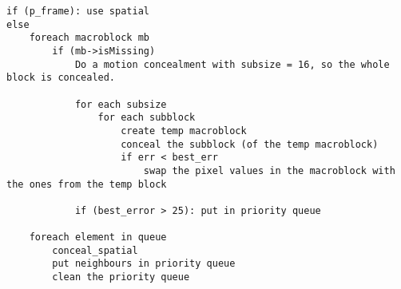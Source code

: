 \vspace{1em}
\begin{lstlisting}[frame=single]
if (p_frame): use spatial
else
	foreach macroblock mb
    	if (mb->isMissing)
        	Do a motion concealment with subsize = 16, so the whole block is concealed.
            
        	for each subsize
            	for each subblock
                	create temp macroblock
                	conceal the subblock (of the temp macroblock)
                    if err < best_err
                    	swap the pixel values in the macroblock with the ones from the temp block
                
            if (best_error > 25): put in priority queue
                
	foreach element in queue
    	conceal_spatial
        put neighbours in priority queue
        clean the priority queue
\end{lstlisting}